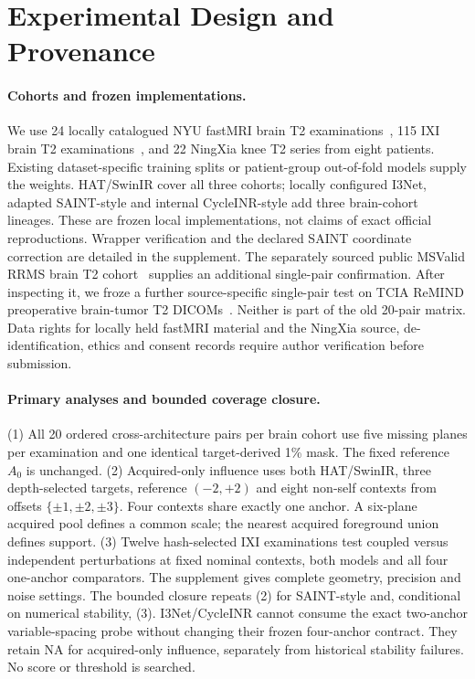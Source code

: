 \documentclass[10pt,twocolumn,letterpaper]{article}
\begin{document}
\section{Experimental Design and Provenance}
\paragraph{Cohorts and frozen implementations.}
We use 24 locally catalogued NYU fastMRI brain T2 examinations~\cite{knoll2020fastmri,muckley2021brain,fastmri_portal}, 115 IXI brain T2 examinations~\cite{ixi_dataset}, and 22 NingXia knee T2 series from eight patients. Existing dataset-specific training splits or patient-group out-of-fold models supply the weights. HAT/SwinIR cover all three cohorts; locally configured I3Net, adapted SAINT-style and internal CycleINR-style add three brain-cohort lineages. These are frozen local implementations, not claims of exact official reproductions. Wrapper verification and the declared SAINT coordinate correction are detailed in the supplement.
The separately sourced public MSValid RRMS brain T2 cohort~\cite{msvalid2024zenodo} supplies an additional single-pair confirmation. After inspecting it, we froze a further source-specific single-pair test on TCIA ReMIND preoperative brain-tumor T2 DICOMs~\cite{remind_tcia}. Neither is part of the old 20-pair matrix. Data rights for locally held fastMRI material and the NingXia source, de-identification, ethics and consent records require author verification before submission.

\paragraph{Primary analyses and bounded coverage closure.}
(1) All 20 ordered cross-architecture pairs per brain cohort use five missing planes per examination and one identical target-derived 1\% mask. The fixed reference $A_0$ is unchanged. (2) Acquired-only influence uses both HAT/SwinIR, three depth-selected targets, reference $(-2,+2)$ and eight non-self contexts from offsets $\{\pm1,\pm2,\pm3\}$. Four contexts share exactly one anchor. A six-plane acquired pool defines a common scale; the nearest acquired foreground union defines support. (3) Twelve hash-selected IXI examinations test coupled versus independent perturbations at fixed nominal contexts, both models and all four one-anchor comparators. The supplement gives complete geometry, precision and noise settings. The bounded closure repeats (2) for SAINT-style and, conditional on numerical stability, (3). I3Net/CycleINR cannot consume the exact two-anchor variable-spacing probe without changing their frozen four-anchor contract. They retain NA for acquired-only influence, separately from historical stability failures. No score or threshold is searched.
\end{document}
